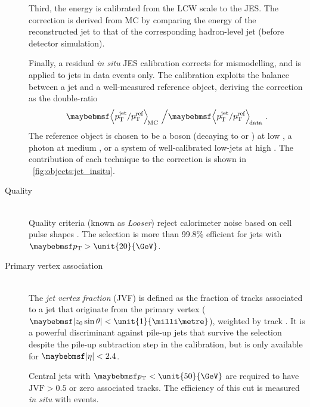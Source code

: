 \begin{description}
	Third, the energy is calibrated from the LCW scale to the \ac{JES}. The correction is 
	derived from MC by comparing the energy of the reconstructed jet to that of the 
	corresponding hadron-level jet (\ie before detector simulation).

	Finally, a residual \textit{in situ} \ac{JES} calibration corrects for mismodelling, 
	and is applied to jets in data events only. The calibration exploits the \pt 
	balance between a jet and a well-measured reference object, deriving the correction 
	as the double-ratio
	\begin{equation}
		\angles{p_{\text{T}}^{\text{jet}} / p_{\text{T}}^{\text{ref}}}_{\text{\!MC}} 
		\,\, \Big/ 
		\angles{p_{\text{T}}^{\text{jet}} / p_{\text{T}}^{\text{ref}}}_{\text{\!data}} 
		\,\,.
	\end{equation}
	The reference object is chosen to be a \PZ boson (decaying to \epluseminus or 
	\HepProcess{\APmuon\Pmuon}) at low \pt, a photon at medium \pt, or a system of 
	well-calibrated low-\pt jets at high \pt. The contribution of each technique to 
	the correction is shown in \Figure~\ref{fig:objects:jet_insitu}.
\item[Quality] \hfill \\
	Quality criteria (known as \textit{Looser}) reject calorimeter noise based on cell 
	pulse shapes \cite{Jets:Quality:2011}. The selection is more than 99.8\% efficient 
	for jets with $\pt > \unit{20}{\GeV}$.
\item[Primary vertex association] \hfill \\
	The \textit{jet vertex fraction} (JVF) is defined as the fraction of tracks 
	associated to a jet that originate from the primary vertex ($\mods{z_0 \sin\theta} < 
	\unit{1}{\milli\metre}$), weighted by track \pt \cite{Jets:PileupCorrection:2012}. 
	It is a powerful discriminant against pile-up jets that survive the \pt selection 
	despite the pile-up subtraction step in the calibration, but is only available for 
	$\mods{\eta} < 2.4$.

	Central jets with $\pt < \unit{50}{\GeV}$ are required to have $\text{JVF} > 0.5$ or 
	zero associated tracks. The efficiency of this cut is measured \textit{in situ} with 
	\Zjets events.
\end{description}

